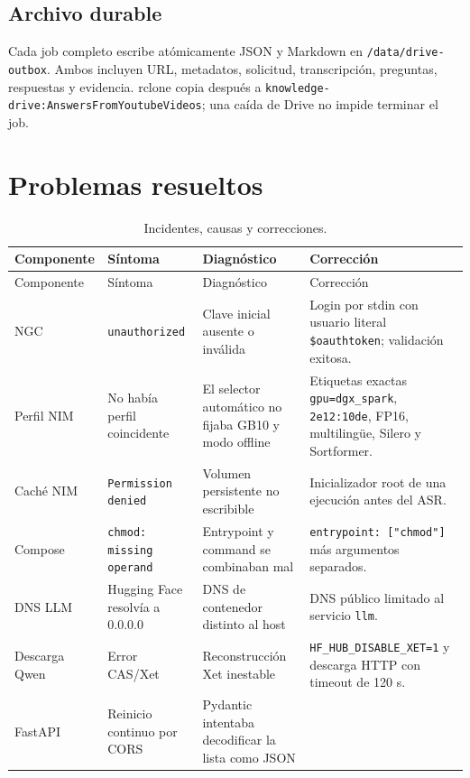 \documentclass[11pt,a4paper]{article}
\begin{document}
\subsection{Archivo durable}
Cada job completo escribe atómicamente JSON y Markdown en
\texttt{/data/drive-outbox}. Ambos incluyen URL, metadatos, solicitud,
transcripción, preguntas, respuestas y evidencia. rclone copia después a
\texttt{knowledge-drive:AnswersFromYoutubeVideos}; una caída de Drive no impide
terminar el job.

\section{Problemas resueltos}

\small
\begin{longtable}{@{}p{}p{}p{}p{}@{}}
  \caption{Incidentes, causas y correcciones.}\\
  \toprule
  Componente & Síntoma & Diagnóstico & Corrección \\
  \midrule
  \endfirsthead
  \toprule
  Componente & Síntoma & Diagnóstico & Corrección \\
  \midrule
  \endhead
  NGC & \texttt{unauthorized} &
    Clave inicial ausente o inválida &
    Login por stdin con usuario literal \texttt{\$oauthtoken}; validación exitosa. \\
  \addlinespace
  Perfil NIM & No había perfil coincidente &
    El selector automático no fijaba GB10 y modo offline &
    Etiquetas exactas \texttt{gpu=dgx\_spark}, \texttt{2e12:10de}, FP16,
    multilingüe, Silero y Sortformer. \\
  \addlinespace
  Caché NIM & \texttt{Permission denied} &
    Volumen persistente no escribible &
    Inicializador root de una ejecución antes del ASR. \\
  \addlinespace
  Compose & \texttt{chmod: missing operand} &
    Entrypoint y command se combinaban mal &
    \texttt{entrypoint: ["chmod"]} más argumentos separados. \\
  \addlinespace
  DNS LLM & Hugging Face resolvía a 0.0.0.0 &
    DNS de contenedor distinto al host &
    DNS público limitado al servicio \texttt{llm}. \\
  \addlinespace
  Descarga Qwen & Error CAS/Xet &
    Reconstrucción Xet inestable &
    \texttt{HF\_HUB\_DISABLE\_XET=1} y descarga HTTP con timeout de 120 s. \\
  \addlinespace
  FastAPI & Reinicio continuo por CORS &
    Pydantic intentaba decodificar la lista como JSON &

\end{longtable}
\end{document}
